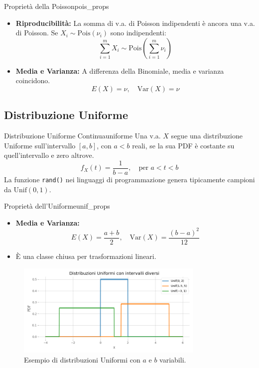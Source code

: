 \begin{proposizione}{Proprietà della Poisson}{pois_props}
\begin{itemize}
    \item \textbf{Riproducibilità:} La somma di v.a. di Poisson indipendenti è ancora una v.a. di Poisson. Se \(X_i \sim \text{Pois}(\nu_i)\) sono indipendenti:
    \[ \sum_{i=1}^{m} X_i \sim \text{Pois}\left(\sum_{i=1}^{m} \nu_i\right) \text{} \]
    \item \textbf{Media e Varianza:} A differenza della Binomiale, media e varianza coincidono.
    \[ E(X) = \nu, \quad \text{Var}(X) = \nu \text{} \]
\end{itemize}
\end{proposizione}

\subsection{Distribuzione Uniforme}

\begin{definizione}{Distribuzione Uniforme Continua}{uniforme}
Una v.a. \(X\) segue una distribuzione Uniforme sull'intervallo \([a,b]\), con \(a<b\) reali, se la sua PDF è costante su quell'intervallo e zero altrove.
\[
f_X(t) = \frac{1}{b-a}, \quad \text{per } a < t < b \text{}
\]
La funzione \texttt{rand()} nei linguaggi di programmazione genera tipicamente campioni da \(\text{Unif}(0,1)\).
\end{definizione}

\begin{proposizione}{Proprietà dell'Uniforme}{unif_props}
\begin{itemize}
    \item \textbf{Media e Varianza:}
    \[ E(X) = \frac{a+b}{2}, \quad \text{Var}(X) = \frac{(b-a)^2}{12} \]
    \item È una classe chiusa per trasformazioni lineari.
\end{itemize}
\end{proposizione}

\begin{figure}[H]
    \centering
    \includegraphics[width=0.8\textwidth]{images/th_01_03/uniforme.png}
    \caption{Esempio di distribuzioni Uniformi con \(a\) e \(b\) variabili.}
    \label{fig:uniforme}
\end{figure}

